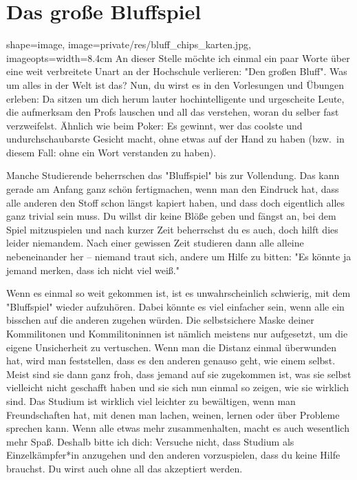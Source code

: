 \section{Das große Bluffspiel}
\begin{pullquote}{shape=image, image=private/res/bluff_chips_karten.jpg, imageopts={width=8.4cm}}
An dieser Stelle möchte ich einmal ein paar Worte über eine weit verbreitete Unart an der Hochschule verlieren: "Den großen Bluff".
Was um alles in der Welt ist das?
Nun, du wirst es in den Vorlesungen und Übungen erleben: Da sitzen um dich herum lauter hochintelligente und urgescheite Leute, die aufmerksam den Profs lauschen und all das verstehen, woran du selber fast verzweifelst.
Ähnlich wie beim Poker: Es gewinnt, wer das coolste und undurchschaubarste Gesicht macht, ohne etwas auf der Hand zu haben (bzw.\ in diesem Fall: ohne ein Wort verstanden zu haben).\pullquotenl

Manche Studierende beherrschen das "Bluffspiel" bis zur Vollendung.
Das kann gerade am Anfang ganz schön fertigmachen, wenn man den Eindruck hat, dass alle anderen den Stoff schon längst kapiert haben, und dass doch eigentlich alles ganz trivial sein muss.
Du willst dir keine Blöße geben und fängst an, bei dem Spiel mitzuspielen und nach kurzer Zeit beherrschst du es auch, doch hilft dies leider niemandem.
Nach einer gewissen Zeit studieren dann alle alleine nebeneinander her -- niemand traut sich, andere um Hilfe zu bitten: "Es könnte ja jemand merken, dass ich nicht viel weiß."%

Wenn es einmal so weit gekommen ist, ist es unwahrscheinlich schwierig, mit dem "Bluffspiel" wieder aufzuhören.
Dabei könnte es viel einfacher sein, wenn alle ein bisschen auf die anderen zugehen würden.
Die selbstsichere Maske deiner Kommilitonen und Kommilitoninnen ist nämlich meistens nur aufgesetzt, um die eigene Unsicherheit zu vertuschen.
Wenn man die Distanz einmal überwunden hat, wird man feststellen, dass es den anderen genauso geht, wie einem selbst.
Meist sind sie dann ganz froh, dass jemand auf sie zugekommen ist, was sie selbst vielleicht nicht geschafft haben und sie sich nun einmal so zeigen, wie sie wirklich sind.
Das Studium ist wirklich viel leichter zu bewältigen, wenn man Freundschaften hat, mit denen man lachen, weinen, lernen oder über Probleme sprechen kann.
Wenn alle etwas mehr zusammenhalten, macht es auch wesentlich mehr Spaß.
Deshalb bitte ich dich: Versuche nicht, dass Studium als Einzelkämpfer*in anzugehen und den anderen vorzuspielen, dass du keine Hilfe brauchst.
Du wirst auch ohne all das akzeptiert werden.\pullquotenl
\pullquotenl

\pullquotenl
\end{pullquote}
